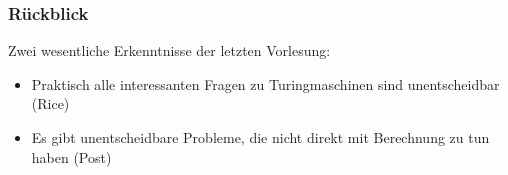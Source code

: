 \documentclass[aspectratio=1610,onlymath]{beamer}
\begin{document}
\maketitle

\begin{frame}\frametitle{Rückblick}

Zwei wesentliche Erkenntnisse der letzten Vorlesung:

\begin{itemize}
\item Praktisch alle interessanten Fragen zu Turingmaschinen sind unentscheidbar (Rice)
\item Es gibt unentscheidbare Probleme, die nicht direkt mit Berechnung zu tun haben (Post)
\end{itemize}

\end{frame}
\end{document}
